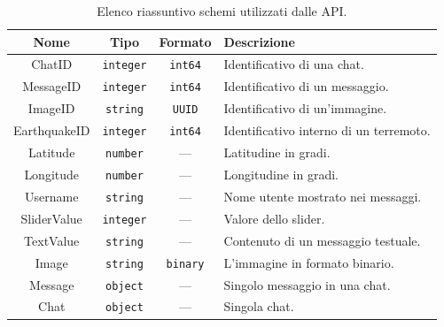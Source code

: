 \begin{table}[ht!]
\centering
\caption{Elenco riassuntivo schemi utilizzati dalle API.}
\label{tab:schemi}

\begin{tabular}{c|c|c|p{14em}}
\textbf{Nome} & \textbf{Tipo} & \textbf{Formato} & \textbf{Descrizione} \\
\hline
ChatID & \texttt{integer} & \texttt{int64} & Identificativo di una chat. \\
MessageID & \texttt{integer} & \texttt{int64} & Identificativo di un messaggio. \\
ImageID & \texttt{string} & \texttt{UUID} & Identificativo di un'immagine. \\
EarthquakeID & \texttt{integer} & \texttt{int64} & Identificativo interno di un terremoto. \\
Latitude & \texttt{number} & --- & Latitudine in gradi. \\
Longitude & \texttt{number} & --- & Longitudine in gradi. \\
Username & \texttt{string} & --- & Nome utente mostrato nei messaggi. \\
SliderValue & \texttt{integer} & --- & Valore dello slider. \\
TextValue & \texttt{string} & --- & Contenuto di un messaggio testuale. \\
Image & \texttt{string} & \texttt{binary} & L'immagine in formato binario. \\
Message & \texttt{object} & --- & Singolo messaggio in una chat. \\
Chat & \texttt{object} & --- & Singola chat.
\end{tabular}
\end{table}

\afterpage{\clearpage}


